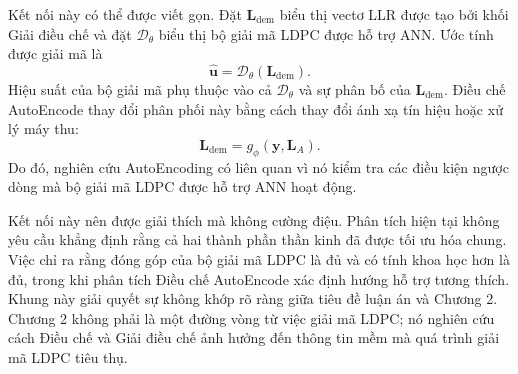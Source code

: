 Kết nối này có thể được viết gọn. Đặt $\mathbf{L}_{\mathrm{dem}}$ biểu thị vectơ LLR được tạo bởi khối Giải điều chế và đặt $\mathcal{D}_\theta$ biểu thị bộ giải mã LDPC được hỗ trợ ANN. Ước tính được giải mã là
\begin{equation}
  \hat{\mathbf{u}}=\mathcal{D}_\theta(\mathbf{L}_{\mathrm{dem}}).
\end{equation}
Hiệu suất của bộ giải mã phụ thuộc vào cả $\mathcal{D}_\theta$ và sự phân bố của $\mathbf{L}_{\mathrm{dem}}$. Điều chế AutoEncode thay đổi phân phối này bằng cách thay đổi ánh xạ tín hiệu hoặc xử lý máy thu:
\begin{equation}
  \mathbf{L}_{\mathrm{dem}}=g_\phi(\mathbf{y},\mathbf{L}_A).
\end{equation}
Do đó, nghiên cứu AutoEncoding có liên quan vì nó kiểm tra các điều kiện ngược dòng mà bộ giải mã LDPC được hỗ trợ ANN hoạt động.

Kết nối này nên được giải thích mà không cường điệu. Phân tích hiện tại không yêu cầu khẳng định rằng cả hai thành phần thần kinh đã được tối ưu hóa chung. Việc chỉ ra rằng đóng góp của bộ giải mã LDPC là đủ và có tính khoa học hơn là đủ, trong khi phân tích Điều chế AutoEncode xác định hướng hỗ trợ tương thích. Khung này giải quyết sự không khớp rõ ràng giữa tiêu đề luận án và Chương 2. Chương 2 không phải là một đường vòng từ việc giải mã LDPC; nó nghiên cứu cách Điều chế và Giải điều chế ảnh hưởng đến thông tin mềm mà quá trình giải mã LDPC tiêu thụ.
